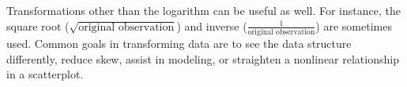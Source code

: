 Transformations other than the logarithm can be useful as well. For instance, the square root ($\sqrt{\text{original observation}}$) and inverse ($\frac{1}{\text{original observation}}$) are sometimes used. Common goals in transforming data are to see the data structure differently, reduce skew, assist in modeling, or straighten a nonlinear relationship in a scatterplot.

